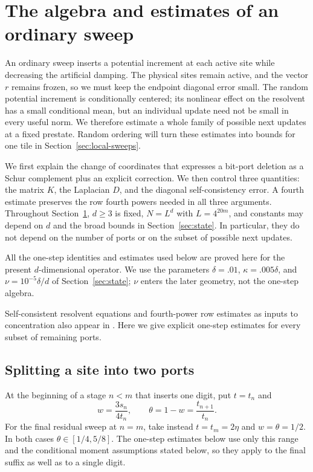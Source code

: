 \section{The algebra and estimates of an ordinary sweep}\label{sec:sweep}

An ordinary sweep inserts a potential increment at each active site while
decreasing the artificial damping. The physical sites remain active,
and the vector $r$ remains frozen, so we must keep the endpoint
diagonal error small.
The random potential increment is
conditionally centered; its nonlinear effect on the resolvent has a small
conditional mean, but an individual update need not be small in every useful norm.
We therefore estimate a whole family of possible next updates at a fixed
prestate. Random ordering will turn these estimates into bounds for one
tile in Section~\ref{sec:local-sweeps}.

We first explain the change of coordinates that expresses a bit-port deletion
as a Schur complement plus an explicit correction. We then control three quantities: the matrix
$K$, the Laplacian $D$, and the diagonal self-consistency error. A fourth
estimate preserves the row fourth powers needed in all three arguments.
Throughout Section~\ref{sec:sweep}, $d\ge3$ is fixed, $N=L^d$ with
$L=4^{20m}$, and constants may depend on $d$ and the broad bounds in
Section~\ref{sec:state}. In particular, they do not depend on the number
of ports or on the subset of possible next updates.

All the one-step identities and estimates used below are proved here for
the present $d$-dimensional operator. We use the parameters
$\delta=.01$, $\kappa=.005\delta$, and $\nu=10^{-5}\delta/d$ of
Section~\ref{sec:state}; $\nu$ enters the later geometry, not the
one-step algebra.

Self-consistent resolvent equations and fourth-power row estimates as
inputs to concentration also appear in
\cite[Sections~1.1--1.2]{BlackDroginHernandez2025}.
Here we give explicit one-step estimates for every subset of remaining
ports.

\subsection{Splitting a site into two ports}

At the beginning of a stage $n<m$ that inserts one digit, put $t=t_n$ and
\[
 w=\frac{3s_n}{4t_n},\qquad
 \theta=1-w=\frac{t_{n+1}}{t_n}.
\]
For the final residual sweep at $n=m$, take instead $t=t_m=2\eta$
and $w=\theta=1/2$. In both cases $\theta\in[1/4,5/8]$.
The one-step estimates below use only this range and the conditional
moment assumptions stated below, so they apply to the final suffix as
well as to a single digit.

